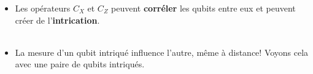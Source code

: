 \documentclass[aspectratio=169,12pt]{beamer}
\begin{document}
\begin{frame}
  \begin{itemize}[<+->]
    \item Les opérateurs $C_X^{}$ et $C_Z^{}$ peuvent \textbf{corréler} les qubits entre eux et peuvent créer de l'\textbf{intrication}.\\~\\
    \item La mesure d'un qubit intriqué influence l'autre, même à distance! Voyons cela avec une paire de qubits intriqués.
     \\~\\
  \end{itemize}
\end{frame}


\end{document}
